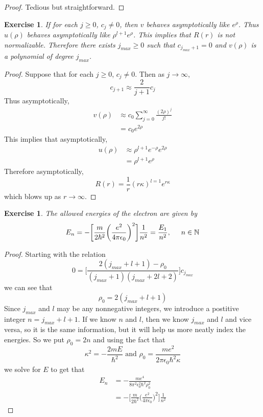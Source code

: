 \documentclass[12pt]{amsart}
\newtheorem{ex}[thm]{Exercise}
\newcommand{\ep}{\epsilon}
\newcommand{\N}{\mathbb{N}}
\begin{document}
\begin{proof}
Tedious but straightforward.
\end{proof}

\begin{ex}
If for each $j \geq 0$, $c_{j} \neq 0$, then $v$ behaves asymptotically like $e^{\rho}$. Thus $u(\rho)$ behaves asymptotically like $\rho^{l+1}e^{\rho}$. This implies that $R(r)$ is not normalizable. Therefore there exists $j_{max} \geq 0$ such that $c_{j_{max}+1} = 0$ and $v(\rho)$ is a polynomial of degree $j_{max}$.
\end{ex}

\begin{proof}
Suppose that for each $j \geq 0$, $c_{j} \neq 0$. Then as $j \rightarrow \infty$, $$c_{j+1} \approx \frac{2}{j+1}c_j$$ Thus asymptotically, 
\begin{align*}
v(\rho) 
& \approx c_0\sum_{j=0}^\infty \frac{(2\rho)^j}{j!} \\ 
&= c_0e^{2\rho}
\end{align*} 
This implies that asymptotically, 
\begin{align*}
u(\rho)
&\approx \rho^{l+1}e^{-\rho}e^{2\rho} \\
&= \rho^{l+1}e^{\rho}
\end{align*} Therefore asymptotically, $$R(r) = \frac{1}{r}(r\kappa)^{l=1}e^{r\kappa}$$ which blows up as $r \rightarrow \infty$.
\end{proof}

\begin{ex}
The allowed energies of the electron are given by $$E_n = - \bigg[\frac{m}{2\hbar^2}\bigg(\frac{e^2}{4 \pi \ep_0}\bigg)^2 \bigg] \frac{1}{n^2} = \frac{E_1}{n^2}, \hspace{.5cm} n \in \N$$
\end{ex}

\begin{proof}
Starting with the relation $$0 = \bigg[ \frac{2(j_{max}+l+1) - \rho_0}{(j_{max}+1)(j_{max}+2l+2)}\bigg]c_{j_{max}}$$ we can see that  $$\rho_0 = 2(j_{max} + l + 1)$$ Since $j_{max}$ and $l$ may be any nonnegative integers, we introduce a postitive integer $n = j_{max} + l + 1$. If we know $n$ and $l$, then we know $j_{max}$ and $l$ and vice versa, so it is the same information, but it will help us more neatly index the energies. So we put $\rho_0 = 2n$ and using the fact that $$\kappa^2 = -\frac{2mE}{\hbar^2}\text{ and } \rho_0 = \frac{me^2}{2\pi\ep_0 \hbar^2 \kappa}$$ we solve for $E$ to get that
\begin{align*}
E_n 
&= -\frac{me^4}{8\pi^2 \ep_0^2 \hbar^2 \rho_0^2}\\
&= -\bigg[\frac{m}{2\hbar^2}\bigg(\frac{e^2}{4 \pi \ep_0}\bigg)^2 \bigg] \frac{1}{n^2}
\end{align*} 
\end{proof}
\end{document}
